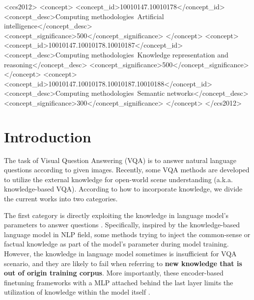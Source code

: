 \documentclass[sigconf]{acmart}
\newcommand{\cjy}[1]{{\color{black}#1}}
\newcommand{\Jeff}[1]{{\color{black}#1}}
\begin{document}
\graphicspath{ {figures/} }

\begin{CCSXML}
<ccs2012>
   <concept>
       <concept_id>10010147.10010178</concept_id>
       <concept_desc>Computing methodologies~Artificial intelligence</concept_desc>
       <concept_significance>500</concept_significance>
       </concept>
   <concept>
       <concept_id>10010147.10010178.10010187</concept_id>
       <concept_desc>Computing methodologies~Knowledge representation and reasoning</concept_desc>
       <concept_significance>500</concept_significance>
       </concept>
   <concept>
       <concept_id>10010147.10010178.10010187.10010188</concept_id>
       <concept_desc>Computing methodologies~Semantic networks</concept_desc>
       <concept_significance>300</concept_significance>
       </concept>
 </ccs2012>
\end{CCSXML}





\maketitle

\section{Introduction}
\Jeff{The task of} Visual Question Answering (VQA) \citep{antol2015vqa} is to answer natural language questions according to given images.
Recently, some VQA methods \citep{DBLP:journals/pami/WangWSDH18,DBLP:conf/cvpr/MarinoRFM19,DBLP:conf/aaai/ShahMYT19} are developed to utilize the external knowledge for open-world scene understanding (a.k.a. knowledge-based VQA). 
According to \Jeff{how to incorporate knowledge}, we divide the current works into two categories.

The first category is directly exploiting the knowledge in language model's parameters to answer questions \citep{DBLP:conf/emnlp/PetroniRRLBWM19,DBLP:conf/akbc/PetroniLPRWM020,DBLP:conf/emnlp/RobertsRS20,DBLP:conf/aaai/BianH0021}. 
Specifically, inspired by the knowledge-based language model in NLP field, some methods 
\citep{DBLP:journals/corr/abs-2101-06013,DBLP:conf/emnlp/GarderesZAL20,DBLP:conf/cvpr/MarinoCP0R21}  trying to \Jeff{inject} the common-sense or factual \cjy{knowledge}  \Jeff{as} part of the model's parameter \Jeff{during} model training. 
However,  the knowledge in language model sometimes is insufficient for VQA scenario, and they are likely to fail when referring to \textbf{new knowledge that is out of origin training corpus}. More importantly, these encoder-based finetuning frameworks with a MLP attached behind the last layer limits the utilization of knowledge within the model itself \citep{DBLP:conf/acl/GaoFC20}.
\end{document}
